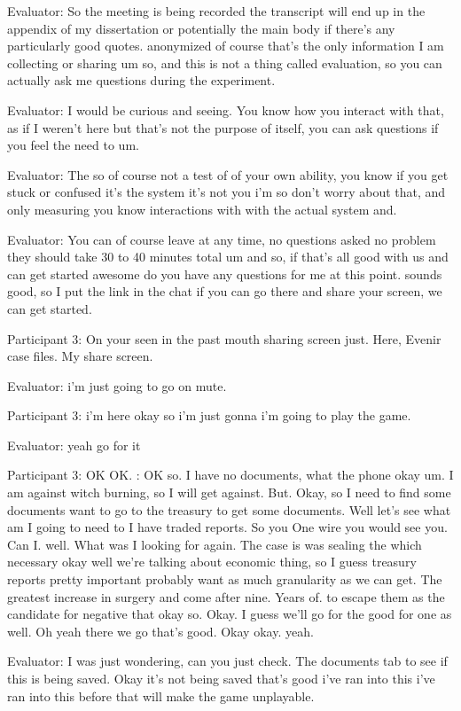 \documentclass{l4proj}
\begin{document}
\begin{appendices}
Evaluator: So the meeting is being recorded the transcript will end up in the appendix of my dissertation or potentially the main body if there's any particularly good quotes. anonymized of course that's the only information I am collecting or sharing um so, and this is not a thing called evaluation, so you can actually ask me questions during the experiment.

Evaluator: I would be curious and seeing. You know how you interact with that, as if I weren't here but that's not the purpose of itself, you can ask questions if you feel the need to um.

Evaluator: The so of course not a test of of your own ability, you know if you get stuck or confused it's the system it's not you i'm so don't worry about that, and only measuring you know interactions with with the actual system and.

Evaluator: You can of course leave at any time, no questions asked no problem they should take 30 to 40 minutes total um and so, if that's all good with us and can get started awesome do you have any questions for me at this point. sounds good, so I put the link in the chat if you can go there and share your screen, we can get started.

Participant 3: On your seen in the past mouth sharing screen just. Here, Evenir case files. My share screen.

Evaluator: i'm just going to go on mute.


Participant 3: i'm here okay so i'm just gonna i'm going to play the game.

Evaluator: yeah go for it


Participant 3: OK OK. : OK so. I have no documents, what the phone okay um. I am against witch burning, so I will get against. But. Okay, so I need to find some documents want to go to the treasury to get some documents. Well let's see what am I going to need to I have traded reports. So you One wire you would see you. Can I. well. What was I looking for again. The case is was sealing the which necessary okay well we're talking about economic thing, so I guess treasury reports pretty important probably want as much granularity as we can get. The greatest increase in surgery and come after nine. Years of. to escape them as the candidate for negative that okay so. Okay. I guess we'll go for the good for one as well. Oh yeah there we go that's good. Okay okay. yeah.

Evaluator: I was just wondering, can you just check. The documents tab to see if this is being saved. Okay it's not being saved that's good i've ran into this i've ran into this before that will make the game unplayable.


\end{appendices}
\end{document}
